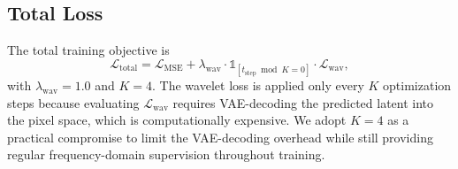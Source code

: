 \subsection{Total Loss}
\label{subsec:combined_loss}

The total training objective is
\begin{equation}
    \mathcal{L}_{\mathrm{total}} = \mathcal{L}_{\mathrm{MSE}} 
    + \lambda_{\mathrm{wav}} \cdot 
    \mathbb{1}_{[t_{\mathrm{step}} \bmod K = 0]} \cdot 
    \mathcal{L}_{\mathrm{wav}},
    \label{eq:total_loss}
\end{equation}
with $\lambda_{\mathrm{wav}} = 1.0$ and $K = 4$. The wavelet loss 
is applied only every $K$ optimization steps because evaluating 
$\mathcal{L}_{\mathrm{wav}}$ requires VAE-decoding the predicted 
latent into the pixel space, which is computationally expensive. 
We adopt $K = 4$ as a practical compromise to limit the 
VAE-decoding overhead while still providing regular 
frequency-domain supervision throughout training.